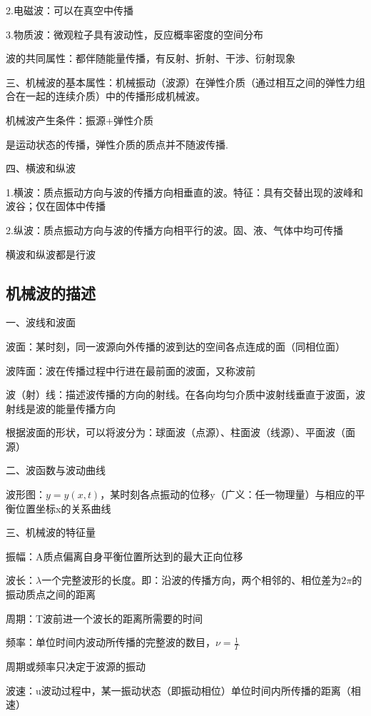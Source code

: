 \documentclass[UTF8]{article}
\begin{document}
    2.电磁波：可以在真空中传播

    3.物质波：微观粒子具有波动性，反应概率密度的空间分布

    波的共同属性：都伴随能量传播，有反射、折射、干涉、衍射现象

    三、机械波的基本属性：机械振动（波源）在弹性介质（通过相互之间的弹性力组合在一起的连续介质）中的传播形成机械波。
    
    机械波产生条件：振源+弹性介质

    是运动状态的传播，弹性介质的质点并不随波传播.
    
    四、横波和纵波

    1.横波：质点振动方向与波的传播方向相垂直的波。特征：具有交替出现的波峰和波谷；仅在固体中传播

    2.纵波：质点振动方向与波的传播方向相平行的波。固、液、气体中均可传播

    横波和纵波都是行波

\subsection{机械波的描述}

    一、波线和波面

    波面：某时刻，同一波源向外传播的波到达的空间各点连成的面（同相位面）
    
    波阵面：波在传播过程中行进在最前面的波面，又称波前

    波（射）线：描述波传播的方向的射线。在各向均匀介质中波射线垂直于波面，波射线是波的能量传播方向

    根据波面的形状，可以将波分为：球面波（点源）、柱面波（线源）、平面波（面源）

    二、波函数与波动曲线

    波形图：$y = y(x,t)$，某时刻各点振动的位移y（广义：任一物理量）与相应的平衡位置坐标x的关系曲线

    三、机械波的特征量

    振幅：A\;\;质点偏离自身平衡位置所达到的最大正向位移

    波长：$\lambda$\;\;一个完整波形的长度。即：沿波的传播方向，两个相邻的、相位差为$2\pi$的振动质点之间的距离

    周期：T\;\;波前进一个波长的距离所需要的时间

    频率：单位时间内波动所传播的完整波的数目，$\nu = \frac{1}{T}$

    周期或频率只决定于波源的振动

    波速：u\;\;波动过程中，某一振动状态（即振动相位）单位时间内所传播的距离（相速）
\end{document}
